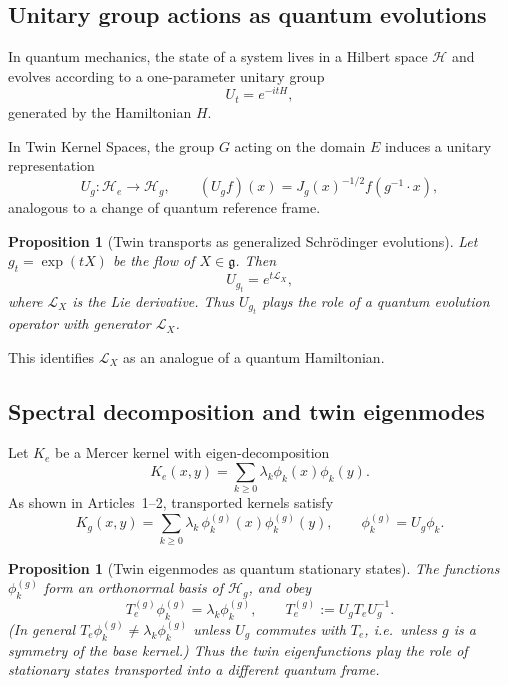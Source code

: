 \documentclass[11pt]{article}
\newtheorem{proposition}[theorem]{Proposition}
\theoremstyle{definition}
\begin{document}
\subsection{Unitary group actions as quantum evolutions}

In quantum mechanics, the state of a system lives in a Hilbert space $\mathcal{H}$ and evolves according to a one-parameter unitary group
\[
U_t = e^{-i t H},
\]
generated by the Hamiltonian $H$.

In Twin Kernel Spaces, the group $G$ acting on the domain $E$ induces a unitary representation
\[
U_g : \mathcal{H}_e \to \mathcal{H}_g,
\qquad (U_g f)(x) = J_g(x)^{-1/2} f(g^{-1}\cdot x),
\]
analogous to a change of quantum reference frame.

\begin{proposition}[Twin transports as generalized Schrödinger evolutions]
	Let $g_t=\exp(tX)$ be the flow of $X\in\mathfrak{g}$.
	Then
	\[
	U_{g_t} = e^{t \mathcal{L}_X},
	\]
	where $\mathcal{L}_X$ is the Lie derivative.
	Thus $U_{g_t}$ plays the role of a quantum evolution operator with generator $\mathcal{L}_X$.
\end{proposition}

This identifies $\mathcal{L}_X$ as an analogue of a quantum Hamiltonian.

\subsection{Spectral decomposition and twin eigenmodes}

Let $K_e$ be a Mercer kernel with eigen-decomposition
\[
K_e(x,y)=\sum_{k\ge 0}\lambda_k \phi_k(x)\phi_k(y).
\]
As shown in Articles~1–2,
transported kernels satisfy
\[
K_g(x,y) = \sum_{k\ge 0}\lambda_k\,\phi_k^{(g)}(x)\phi_k^{(g)}(y),
\qquad
\phi_k^{(g)} = U_g\phi_k.
\]

\begin{proposition}[Twin eigenmodes as quantum stationary states]
	The functions $\phi_k^{(g)}$ form an orthonormal basis of $\mathcal{H}_g$, and obey
	\[
	T_e^{(g)} \phi_k^{(g)} = \lambda_k \phi_k^{(g)},
	\qquad T_e^{(g)} := U_g T_e U_g^{-1}.
	\]
	(In general $T_e\phi_k^{(g)}\neq\lambda_k\phi_k^{(g)}$ unless $U_g$ commutes with $T_e$, i.e.\ unless $g$ is a symmetry of the base kernel.)
	Thus the twin eigenfunctions play the role of stationary states transported into a different quantum frame.
\end{proposition}
\end{document}
